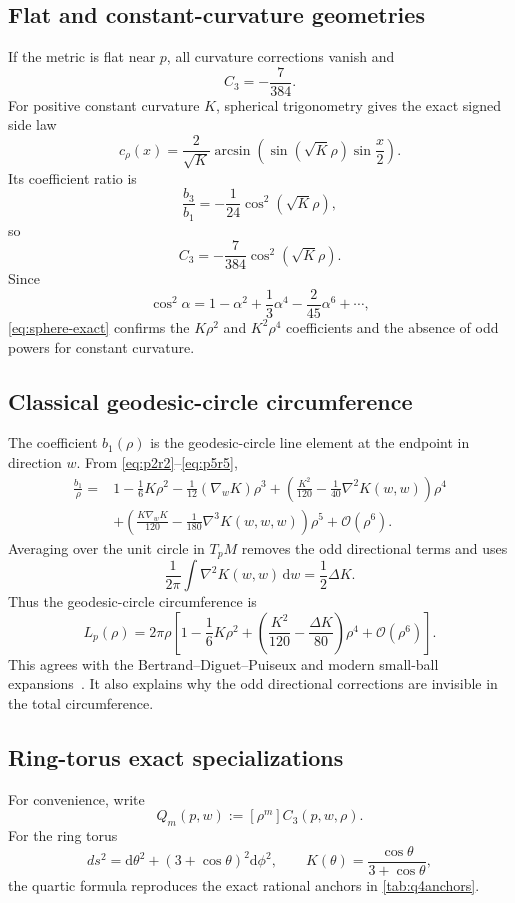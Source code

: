 \documentclass[11pt]{amsart}
\numberwithin{equation}{section}
\theoremstyle{remark}
\newcommand{\bigO}{\mathcal{O}}
\newcommand{\Hess}{\nabla^2}
\newcommand{\Third}{\nabla^3}
\newcommand{\dd}{\mathrm{d}}
\begin{document}
\subsection{Flat and constant-curvature geometries}
If the metric is flat near $p$, all curvature corrections vanish and
\[
 C_3=-\frac7{384}.
\]
For positive constant curvature $K$, spherical trigonometry gives the exact signed side law
\[
 c_{\rho}(x)=\frac{2}{\sqrt K}\arcsin\!\left(\sin(\sqrt K\rho)\sin\frac{x}{2}\right).
\]
Its coefficient ratio is
\[
 \frac{b_3}{b_1}=-\frac1{24}\cos^2(\sqrt K\rho),
\]
so
\begin{equation}\label{eq:sphere-exact}
 C_3=-\frac7{384}\cos^2(\sqrt K\rho).
\end{equation}
Since
\[
 \cos^2\alpha=1-\alpha^2+\frac13\alpha^4-\frac{2}{45}\alpha^6+\cdots,
\]
\eqref{eq:sphere-exact} confirms the $K\rho^2$ and $K^2\rho^4$ coefficients and the absence of odd powers for constant curvature.

\subsection{Classical geodesic-circle circumference}
The coefficient $b_1(\rho)$ is the geodesic-circle line element at the endpoint in direction $w$.  From \eqref{eq:p2r2}--\eqref{eq:p5r5},
\begin{align*}
\frac{b_1}{\rho}
={}&1-\frac16K\rho^2-\frac1{12}(\nabla_wK)\rho^3
+\left(\frac{K^2}{120}-\frac1{40}\Hess K(w,w)\right)\rho^4\\
&+\left(\frac{K\nabla_wK}{120}-\frac1{180}\Third K(w,w,w)\right)\rho^5
+\bigO(\rho^6).
\end{align*}
Averaging over the unit circle in $T_pM$ removes the odd directional terms and uses
\[
 \frac1{2\pi}\int\Hess K(w,w)\,\dd w=\frac12\Delta K.
\]
Thus the geodesic-circle circumference is
\begin{equation}\label{eq:circumference}
 L_p(\rho)=2\pi\rho\left[1-\frac16K\rho^2
+\left(\frac{K^2}{120}-\frac{\Delta K}{80}\right)\rho^4
+\bigO(\rho^6)\right].
\end{equation}
This agrees with the Bertrand--Diguet--Puiseux and modern small-ball expansions~\cite{Bertrand1848,Diguet1848,Puiseux1848,Gray1974}.  It also explains why the odd directional corrections are invisible in the total circumference.

\subsection{Ring-torus exact specializations}
For convenience, write
\[
Q_m(p,w):=[\rho^m]C_3(p,w,\rho).
\]
For the ring torus
\[
 ds^2=\dd\theta^2+(3+\cos\theta)^2\dd\phi^2,
 \qquad K(\theta)=\frac{\cos\theta}{3+\cos\theta},
\]
the quartic formula reproduces the exact rational anchors in \cref{tab:q4anchors}.
\end{document}
